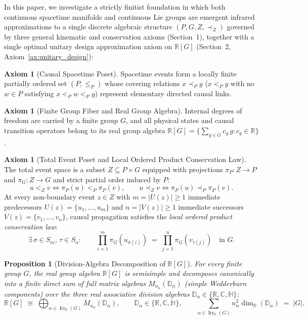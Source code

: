 \documentclass[11pt,a4paper]{article}
\newtheorem{proposition}[theorem]{Proposition}
\theoremstyle{definition}
\newtheorem{axiom}[theorem]{Axiom}
\theoremstyle{remark}
\newcommand{\R}{\mathbb{R}}
\newcommand{\C}{\mathbb{C}}
\newcommand{\quat}{\mathbb{H}}
\newcommand{\Irr}{\operatorname{Irr}}
\begin{document}
In this paper, we investigate a strictly finitist foundation in which both continuous spacetime manifolds and continuous Lie groups are emergent infrared approximations to a single discrete algebraic structure $(P, G, Z, \prec_Z)$ governed by three general kinematic and conservation axioms (Section~1), together with a single optimal unitary design approximation axiom on $\R[G]$ (Section~2, Axiom~\ref{ax:unitary_design}):

\begin{axiom}[Causal Spacetime Poset]
\label{ax:poset}
Spacetime events form a locally finite partially ordered set $(P, \le_P)$ whose covering relations $x \prec_P y$ ($x <_P y$ with no $w \in P$ satisfying $x <_P w <_P y$) represent elementary directed causal links.
\end{axiom}

\begin{axiom}[Finite Group Fiber and Real Group Algebra]
\label{ax:group}
Internal degrees of freedom are carried by a finite group $G$, and all physical states and causal transition operators belong to its real group algebra $\R[G] = \bigl\{\sum_{g \in G} c_g\,g : c_g \in \R\bigr\}$.
\end{axiom}

\begin{axiom}[Total Event Poset and Local Ordered Product Conservation Law]
\label{ax:conservation}
The total event space is a subset $Z \subseteq P \times G$ equipped with projections $\pi_P : Z \to P$ and $\pi_G : Z \to G$ and strict partial order induced by $P$:
\begin{equation}
\label{eq:induced_order}
u <_Z v \iff \pi_P(u) <_P \pi_P(v), \qquad u \prec_Z v \iff \pi_P(u) \prec_P \pi_P(v).
\end{equation}
At every non-boundary event $z \in Z$ with $m = |U(z)| \ge 1$ immediate predecessors $U(z) = \{u_1, \dots, u_m\}$ and $n = |V(z)| \ge 1$ immediate successors $V(z) = \{v_1, \dots, v_n\}$, causal propagation satisfies the \emph{local ordered product conservation law}:
\begin{equation}
\label{eq:product_law}
\exists\, \sigma \in S_m,\, \tau \in S_n : \qquad \prod_{i=1}^m \pi_G(u_{\sigma(i)}) \;=\; \prod_{j=1}^n \pi_G(v_{\tau(j)}) \quad \text{in } G.
\end{equation}
\end{axiom}

\begin{proposition}[Division-Algebra Decomposition of {$\R[G]$}]
\label{prop:wedderburn}
For every finite group $G$, the real group algebra $\R[G]$ is semisimple and decomposes canonically into a finite direct sum of full matrix algebras $M_{n_\alpha}(\mathbb{D}_\alpha)$ (\emph{simple Wedderburn components}) over the three real associative division algebras $\mathbb{D}_\alpha \in \{\R, \C, \quat\}$:
\begin{equation}
\label{eq:wedderburn}
\R[G] \;\cong\; \bigoplus_{\alpha \in \Irr_{\R}(G)} M_{n_\alpha}(\mathbb{D}_\alpha), \qquad \mathbb{D}_\alpha \in \{\R, \C, \quat\}, \qquad \sum_{\alpha \in \Irr_{\R}(G)} n_\alpha^2 \dim_{\R}(\mathbb{D}_\alpha) \;=\; |G|.
\end{equation}
\end{proposition}
\end{document}
